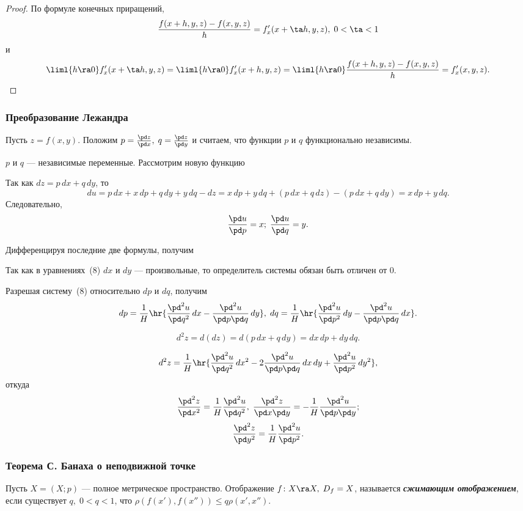 \documentclass[a4paper]{article}
\begin{document}
\begin{proof}
По формуле конечных приращений, $$\frac{f(x+h,y,z)-f(x,y,z)}{h} =
f'_x(x+\ta h,y,z), \; 0<\ta<1$$ и $$\liml{h\ra0} f'_x (x+\ta h,y,z)
= \liml{h\ra0} f'_x(x+h,y,z) = \liml{h\ra0}
\frac{f(x+h,y,z)-f(x,y,z)}{h} = f'_x(x,y,z).$$
\end{proof}

\subsubsection{ Преобразование Лежандра}
Пусть $z=f(x,y)$. Положим $p=\frac{\pd z}{\pd x}, \; q=\frac{\pd
z}{\pd y}$ и считаем, что функции $p$ и $q$ функционально
независимы.

$\boxed{p \mbox{ и } q}$ --- независимые переменные. Рассмотрим
новую функцию 

Так как $dz=p\,dx+q\,dy$, то $$du=p\,dx + x\,dp + q\,dy + y\,dq - dz
= x\,dp + y\,dq + (p\,dx + q\,dz) - (p\,dx + q\,dy) = x\,dp +
y\,dq.$$ Следовательно, $$\frac{\pd u}{\pd p}=x; \; \frac{\pd u}{\pd
q} = y.$$

Дифференцируя последние две формулы, получим 

Так как в уравнениях~(8) $dx$ и $dy$ --- произвольные, то
определитель системы обязан быть отличен от $0$.


Разрешая систему~(8) относительно $dp$ и $dq$, получим $$dp =
\frac1H \hr{\frac{\pd^2 u}{\pd q^2}\,dx - \frac{\pd^2 u}{\pd p \pd
q}\,dy}, \; dq = \frac1H \hr{\frac{\pd^2 u}{\pd p^2}\,dy -
\frac{\pd^2 u}{\pd p \pd q}\,dx}.$$

$$d^2z = d(dz) = d(p\,dx+q\,dy)=dx\,dp+dy\,dq.$$

$$d^2z=\frac1H \hr{\frac{\pd^2 u}{\pd q^2}\,dx^2 - 2\frac{\pd^2 u}{\pd p
\pd q}\,dx\,dy + \frac{\pd^2 u}{\pd p^2}\,dy^2},$$ откуда
$$\frac{\pd^2 z}{\pd x^2} = \frac1H \frac{\pd^2 u}{\pd q^2}, \;
\frac{\pd^2 z}{\pd x \pd y} = -\frac1H \frac{\pd^2 u}{\pd p \pd
y};$$ $$\frac{\pd^2 z}{\pd y^2} = \frac1H \frac{\pd^2 u}{\pd p^2}.$$

\subsubsection{ Теорема С. Банаха о неподвижной точке}
Пусть $X=(X;p)$ --- полное метрическое пространство. Отображение
$f\colon X\ra X, \; D_f=X$, называется \emph{\textbf{сжимающим
отображением}}, если существует $q, \; 0<q<1$, что $\rho
(f(x'),f(x'')) \le q \rho(x',x'')$.
\end{document}
